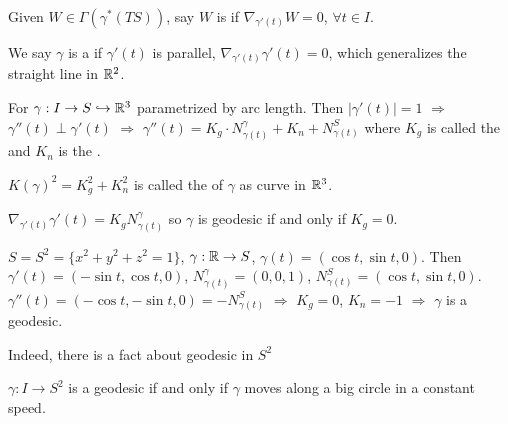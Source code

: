 
\begin{example}
    \,

\end{example}

Given  $ W\in \Gamma(\gamma^*(TS)) $, say  $ W  $ is  if  $ \nabla_{\gamma'(t)}W=0 $,  $ \forall t\in I $. 

We say  $ \gamma  $ is a  if  $ \gamma'(t) $ is parallel, \ie  $ \nabla_{\gamma'(t)}\gamma'(t)=0 $, which generalizes the straight line in  $ \mathbb R^2 $.

For  $ \gamma:I\rightarrow S\hookrightarrow \mathbb R^3 $ parametrized by arc length. Then  $ |\gamma'(t)|=1 $ $ \Rightarrow  $  $ \gamma''(t)\perp \gamma'(t) $  $ \Rightarrow  $  $ \gamma''(t)=K_g\cdot N_{\gamma(t)}^\gamma+K_n+N_{\gamma(t)}^S $ where  $ K_g $ is called the  and  $ K_n $ is the .

 $ K(\gamma)^2=K_g^2+K_n^2 $ is called the  of  $ \gamma $ as curve in  $ \mathbb R^3 $.
 
 $ \nabla_{\gamma'(t)}\gamma'(t)=K_g N_{\gamma(t)}^\gamma $ so  $ \gamma $ is geodesic if and only if  $ K_g=0 $.
 
\begin{example}
     $ S=S^2=\{x^2+y^2+z^2=1\} $,  $ \gamma:\mathbb R\rightarrow S $,  $ \gamma(t)=(\cos t,\sin t,0) $. Then  $ \gamma'(t)=(-\sin t,\cos t,0) $,  $ N_{\gamma(t)}^\gamma=(0,0,1) $,  $ N_{\gamma(t)}^S=(\cos t,\sin t,0) $. $ \gamma''(t)=(-\cos t,-\sin t,0)=-N_{\gamma(t)}^S $ $ \Rightarrow $  $ K_g=0 $,  $ K_n=-1 $ $ \Rightarrow  $ $ \gamma  $ is a geodesic.
    
    Indeed, there is a fact about geodesic in  $ S^2 $
    \begin{fact}
        $ \gamma:I\rightarrow S^2 $ is a geodesic if and only if  $ \gamma $ moves along a big circle in a constant speed.  
    \end{fact} 
\end{example}

